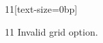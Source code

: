\documentclass[paper=A4]{ropas-poster}
\begin{document}
\begin{postergrid}{1}{1}[text-size=0bp]
\begin{posterblock}{1}{1}
Invalid grid option.
\end{posterblock}
\end{postergrid}
\end{document}
